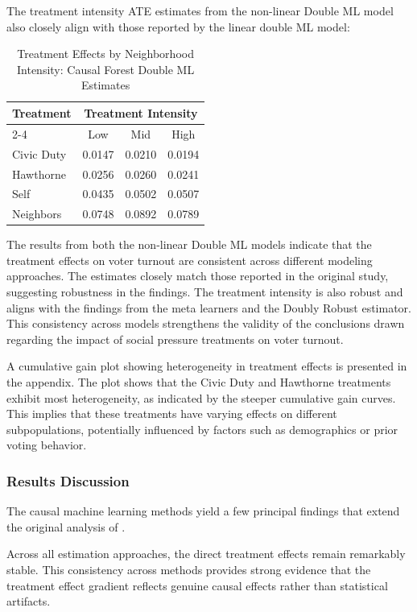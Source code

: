 \documentclass[11pt]{article}
\begin{document}
    The treatment intensity ATE estimates from the non-linear Double ML model also closely align with those reported by the linear double ML model:
    \begin{table}[H]
    \centering
    \caption{Treatment Effects by Neighborhood Intensity: Causal Forest Double ML Estimates}
    \begin{tabular}{lccc}
        \toprule
        Treatment & \multicolumn{3}{c}{Treatment Intensity} \\
        \cmidrule(lr){2-4}
         & Low & Mid & High \\
        \midrule
        Civic Duty & 0.0147 & 0.0210 & 0.0194 \\
        Hawthorne & 0.0256 & 0.0260 & 0.0241 \\
        Self & 0.0435 & 0.0502 & 0.0507 \\
        Neighbors & 0.0748 & 0.0892 & 0.0789 \\
        \bottomrule
    \end{tabular}
    \label{tab:intensity_effects}
    \end{table}

    The results from both the non-linear Double ML models indicate that the treatment effects on voter turnout are consistent across different modeling approaches. The estimates closely match those reported in the original study, suggesting robustness in the findings. The treatment intensity is also robust and aligns with the findings from the meta learners and the Doubly Robust estimator. This consistency across models strengthens the validity of the conclusions drawn regarding the impact of social pressure treatments on voter turnout.

    A cumulative gain plot showing heterogeneity in treatment effects is presented in the appendix. The plot shows that the Civic Duty and Hawthorne treatments exhibit most heterogeneity, as indicated by the steeper cumulative gain curves. This implies that these treatments have varying effects on different subpopulations, potentially influenced by factors such as demographics or prior voting behavior.


\subsubsection{Results Discussion}
The causal machine learning methods yield a few principal findings that extend the original analysis of \citet{gerber_social_2008}.

Across all estimation approaches, the direct treatment effects remain remarkably stable.  This consistency across methods provides strong evidence that the treatment effect gradient reflects genuine causal effects rather than statistical artifacts.
\end{document}
